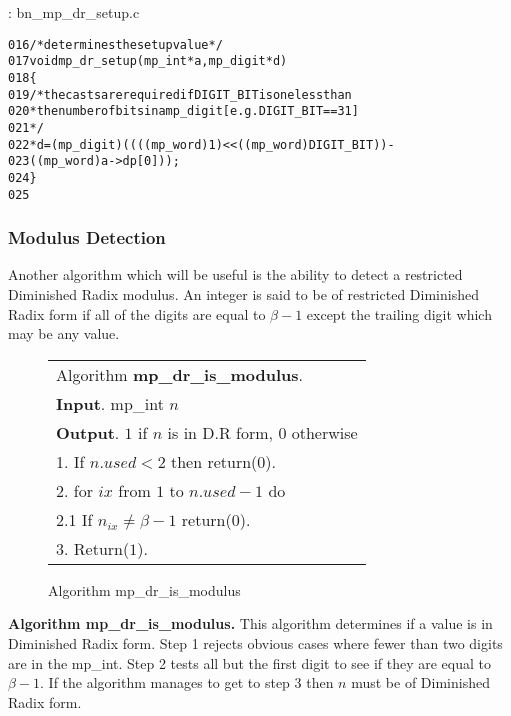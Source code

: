 \documentclass[b5paper]{book}
\begin{document}
\vspace{+3mm}\begin{small}
\hspace{-5.1mm}{\bf File}: bn\_mp\_dr\_setup.c
\vspace{-3mm}
\begin{alltt}
016   /* determines the setup value */
017   void mp_dr_setup(mp_int *a, mp_digit *d)
018   \{
019      /* the casts are required if DIGIT_BIT is one less than
020       * the number of bits in a mp_digit [e.g. DIGIT_BIT==31]
021       */
022      *d = (mp_digit)((((mp_word)1) << ((mp_word)DIGIT_BIT)) - 
023           ((mp_word)a->dp[0]));
024   \}
025   
\end{alltt}
\end{small}

\subsubsection{Modulus Detection}
Another algorithm which will be useful is the ability to detect a restricted Diminished Radix modulus.  An integer is said to be
of restricted Diminished Radix form if all of the digits are equal to $\beta - 1$ except the trailing digit which may be any value.

\begin{figure}[!here]
\begin{small}
\begin{center}
\begin{tabular}{l}
\hline Algorithm \textbf{mp\_dr\_is\_modulus}. \\
\textbf{Input}.   mp\_int $n$ \\
\textbf{Output}.  $1$ if $n$ is in D.R form, $0$ otherwise \\
\hline
1.  If $n.used < 2$ then return($0$). \\
2.  for $ix$ from $1$ to $n.used - 1$ do \\
\hspace{3mm}2.1  If $n_{ix} \ne \beta - 1$ return($0$). \\
3.  Return($1$). \\
\hline
\end{tabular}
\end{center}
\end{small}
\caption{Algorithm mp\_dr\_is\_modulus}
\end{figure}

\textbf{Algorithm mp\_dr\_is\_modulus.}
This algorithm determines if a value is in Diminished Radix form.  Step 1 rejects obvious cases where fewer than two digits are
in the mp\_int.  Step 2 tests all but the first digit to see if they are equal to $\beta - 1$.  If the algorithm manages to get to
step 3 then $n$ must be of Diminished Radix form.
\end{document}
